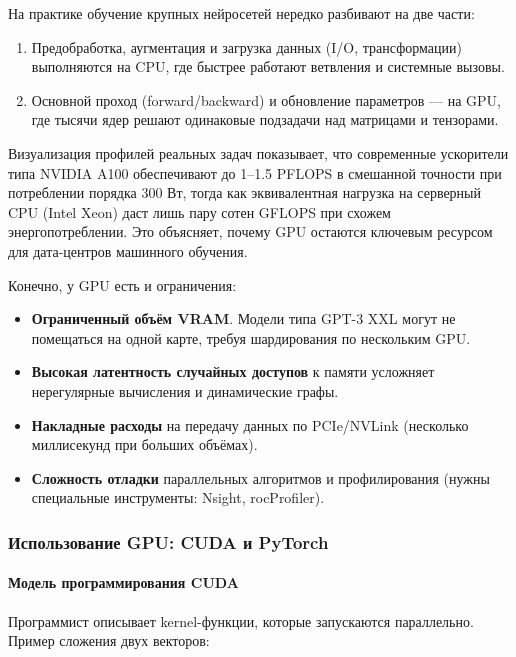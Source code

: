На практике обучение крупных нейросетей нередко разбивают на две части:  
\begin{enumerate}  
  \item Предобработка, аугментация и загрузка данных (I/O, трансформации) выполняются на CPU, где быстрее работают ветвления и системные вызовы.  
  \item Основной проход (forward/backward) и обновление параметров — на GPU, где тысячи ядер решают одинаковые подзадачи над матрицами и тензорами.  
\end{enumerate}  

Визуализация профилей реальных задач показывает, что современные ускорители типа NVIDIA A100 обеспечивают до 1–1.5 PFLOPS в смешанной точности при потреблении порядка 300 Вт, тогда как эквивалентная нагрузка на серверный CPU (Intel Xeon) даст лишь пару сотен GFLOPS при схожем энергопотреблении. Это объясняет, почему GPU остаются ключевым ресурсом для дата-центров машинного обучения.  

Конечно, у GPU есть и ограничения:  
\begin{itemize}  
  \item \textbf{Ограниченный объём VRAM}. Модели типа GPT-3 XXL могут не помещаться на одной карте, требуя шардирования по нескольким GPU.  
  \item \textbf{Высокая латентность случайных доступов} к памяти усложняет нерегулярные вычисления и динамические графы.  
  \item \textbf{Накладные расходы} на передачу данных по PCIe/NVLink (несколько миллисекунд при больших объёмах).  
  \item \textbf{Сложность отладки} параллельных алгоритмов и профилирования (нужны специальные инструменты: Nsight, rocProfiler).  
\end{itemize}  


\subsubsection{Использование GPU: CUDA и PyTorch}
\label{sec:tools_gpu}

\paragraph{Модель программирования CUDA}
Программист описывает kernel-функции, которые запускаются параллельно. Пример сложения двух векторов:

